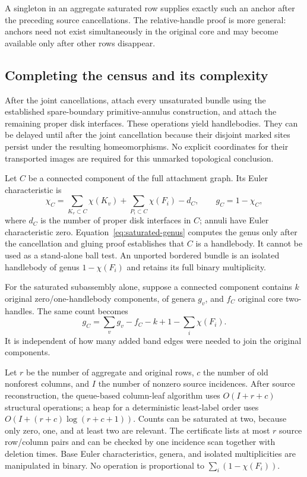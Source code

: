 A singleton in an aggregate saturated row supplies exactly such an
anchor after the preceding source cancellations.  The relative-handle
proof is more general: anchors need not exist simultaneously in the
original core and may become available only after other rows disappear.

\subsection{Completing the census and its complexity}

After the joint cancellations, attach every unsaturated bundle using
the established spare-boundary primitive-annulus construction, and
attach the remaining proper disk interfaces.  These operations yield
handlebodies.  They can be delayed until after the joint cancellation
because their disjoint marked sites persist under the resulting
homeomorphisms.  No explicit coordinates for their transported images
are required for this unmarked topological conclusion.

Let $C$ be a connected component of the full attachment graph.  Its
Euler characteristic is
\begin{equation}
 \chi_C
 =\sum_{K_v\subset C}\chi(K_v)
  +\sum_{P_i\subset C}\chi(F_i)
  -d_C,
 \qquad g_C=1-\chi_C,
 \label{eq:saturated-genus}
\end{equation}
where $d_C$ is the number of proper disk interfaces in $C$; annuli have
Euler characteristic zero.  Equation~\eqref{eq:saturated-genus} computes
the genus only after the cancellation and gluing proof establishes that
$C$ is a handlebody.  It cannot be used as a stand-alone ball test.
An unported bordered bundle is an isolated handlebody of genus
$1-\chi(F_i)$ and retains its full binary multiplicity.

For the saturated subassembly alone, suppose a connected component
contains $k$ original zero/one-handlebody components, of genera $g_v$,
and $f_C$ original core two-handles.  The same count becomes
\[
 g_C=\sum_v g_v-f_C-k+1-\sum_i\chi(F_i).
\]
It is independent of how many added band edges were needed to join the
original components.

Let $r$ be the number of aggregate and original rows, $c$ the number of
old nonforest columns, and $I$ the number of nonzero source incidences.
After source reconstruction, the queue-based column-leaf algorithm uses
$O(I+r+c)$ structural operations; a heap for a deterministic least-label
order uses $O(I+(r+c)\log(r+c+1))$.  Counts can be saturated at two,
because only zero, one, and at least two are relevant.  The certificate
lists at most $r$ source row/column pairs and can be checked by one
incidence scan together with deletion times.  Base Euler
characteristics, genera, and isolated multiplicities are manipulated in
binary.  No operation is proportional to $\sum_i(1-\chi(F_i))$.

